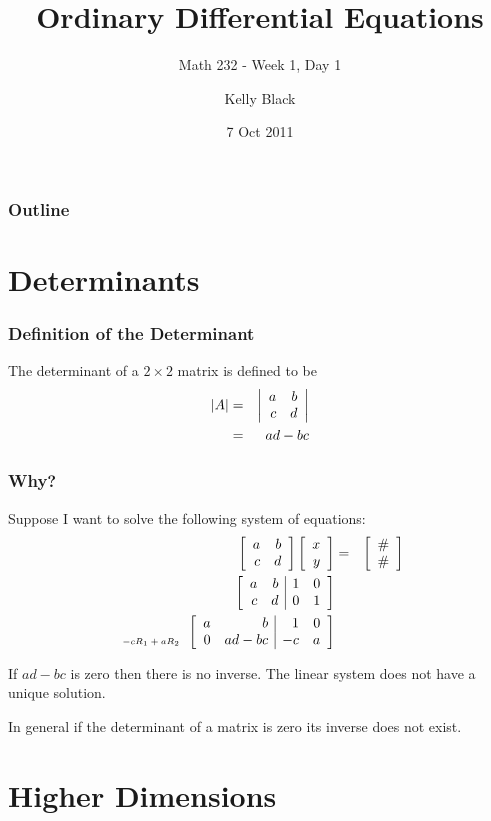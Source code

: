


\title{Ordinary Differential Equations}
\subtitle{Math 232 - Week 1, Day 1}

\author{Kelly Black}
\date{7 Oct 2011}

\begin{frame}
  \titlepage
\end{frame}

\begin{frame}
  \frametitle{Outline}
\end{frame}


\section{Determinants}


\begin{frame}
  \frametitle{Definition of the Determinant}

  The determinant of a $2\times 2$ matrix is defined to be
  \begin{eqnarray*}
    |A| & = & \left| \begin{array}{rr} a & b \\ c & d \end{array} \right| \\
    & = & ad - bc
  \end{eqnarray*}

\end{frame}


\begin{frame}
  \frametitle{Why?}

  Suppose I want to solve the following system of equations:
  \begin{eqnarray*}
    \arrayTwo{a}{b}{c}{d} \vecTwo{x}{y} & = & \vecTwo{\#}{\#} \\
    \startRowOpsTwo
    \oneRowOpsTwo{a}{b}{1}{0}
    \oneRowOpsTwo{c}{d}{0}{1}
    \stopRowOps \\
    \stateTwo{}{-cR_1+aR_2}
    \startRowOpsTwo
    \oneRowOpsTwo{a}{b}{1}{0}
    \oneRowOpsTwo{0}{ad-bc}{-c}{a}
    \stopRowOps
  \end{eqnarray*}

  {
    If $ad-bc$ is zero then there is no inverse. The linear system
    does not have a unique solution.
  }

  {
    In general if the determinant of a matrix is zero its inverse does
    not exist. 
  }

\end{frame}


\section{Higher Dimensions}

